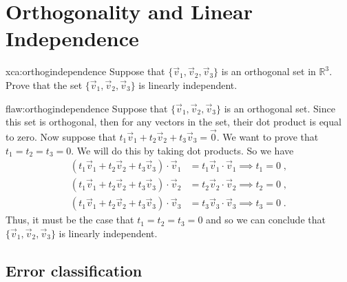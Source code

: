 \section{Orthogonality and Linear Independence}

\begin{xca}{xca:orthogindependence}
Suppose that $\{\vec{v}_1, \vec{v}_2, \vec{v}_3\}$ is an orthogonal set in $\mathbb{R}^3$. Prove that the set $\{\vec{v}_1, \vec{v}_2, \vec{v}_3\}$ is linearly independent.
\end{xca}

\begin{flaw}{flaw:orthogindependence} %
Suppose that $\{\vec{v}_1, \vec{v}_2, \vec{v}_3\}$ is an orthogonal set. Since this set is orthogonal, then for any vectors in the set, their dot product is equal to zero. Now suppose that $t_1\vec{v}_1 + t_2\vec{v}_2 + t_3\vec{v}_3 = \vec{0}$. We want to prove that $t_1=t_2=t_3=0.$ We will do this by taking dot products. So we have
\begin{align*}
    \left(t_1\vec{v}_1 + t_2\vec{v}_2 + t_3\vec{v}_3\right) \cdot \vec{v}_1 &= t_1\vec{v}_1 \cdot \vec{v}_1 \implies t_1 = 0\;, \\
    \left(t_1\vec{v}_1 + t_2\vec{v}_2 + t_3\vec{v}_3\right) \cdot \vec{v}_2 &= t_2\vec{v}_2 \cdot \vec{v}_2 \implies t_2 = 0\;, \\
    \left(t_1\vec{v}_1 + t_2\vec{v}_2 + t_3\vec{v}_3\right) \cdot \vec{v}_3 &= t_3\vec{v}_3 \cdot \vec{v}_3  \implies t_3 = 0\;.
\end{align*}
Thus, it must be the case that $t_1=t_2=t_3=0$ and so we can conclude that $\{\vec{v}_1, \vec{v}_2,\vec{v}_3 \}$ is linearly independent.

\end{flaw}

\clearpage
\subsection{Error classification}


